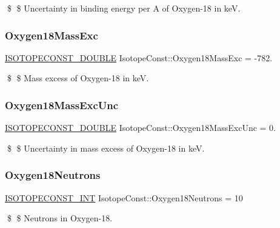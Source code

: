 \$ \$ Uncertainty in binding energy per A of Oxygen-\/18 in keV. \mbox{\label{group___isotope_const-_oxygen-_o18_ga7f496c6a37ef11f67c8bd3e7ba52a0a7}} 
\subsubsection{\texorpdfstring{Oxygen18\+Mass\+Exc}{Oxygen18MassExc}}
{\footnotesize\ttfamily \mbox{\hyperlink{group___isotope_const-_macros_ga8f45a7272ce02c0b4c65c44636ed719a}{I\+S\+O\+T\+O\+P\+E\+C\+O\+N\+S\+T\+\_\+\+D\+O\+U\+B\+LE}} Isotope\+Const\+::\+Oxygen18\+Mass\+Exc = -\/782.}

\$ \$ Mass excess of Oxygen-\/18 in keV. \mbox{\label{group___isotope_const-_oxygen-_o18_ga150d8bcb18fd61685ca043c6c74a40b0}} 
\subsubsection{\texorpdfstring{Oxygen18\+Mass\+Exc\+Unc}{Oxygen18MassExcUnc}}
{\footnotesize\ttfamily \mbox{\hyperlink{group___isotope_const-_macros_ga8f45a7272ce02c0b4c65c44636ed719a}{I\+S\+O\+T\+O\+P\+E\+C\+O\+N\+S\+T\+\_\+\+D\+O\+U\+B\+LE}} Isotope\+Const\+::\+Oxygen18\+Mass\+Exc\+Unc = 0.}

\$ \$ Uncertainty in mass excess of Oxygen-\/18 in keV. \mbox{\label{group___isotope_const-_oxygen-_o18_ga5f56459140784c26832e6c1f4553162d}} 
\subsubsection{\texorpdfstring{Oxygen18\+Neutrons}{Oxygen18Neutrons}}
{\footnotesize\ttfamily \mbox{\hyperlink{group___isotope_const-_macros_ga5f18360b3e99483a35c32d789e62621c}{I\+S\+O\+T\+O\+P\+E\+C\+O\+N\+S\+T\+\_\+\+I\+NT}} Isotope\+Const\+::\+Oxygen18\+Neutrons = 10}

\$ \$ Neutrons in Oxygen-\/18. \mbox{\label{group___isotope_const-_oxygen-_o18_ga5b8d51af12a133695ba36a3e5102113d}} 
